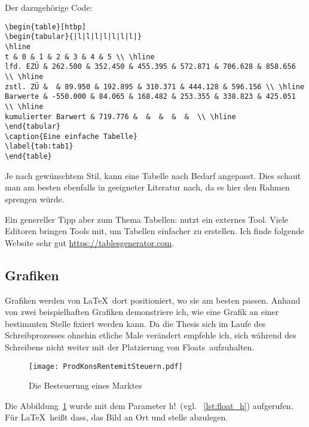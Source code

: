 Der dazugehörige Code:
\begin{lstlisting}[float=htb,caption=Darstellungen einer Tabelle in \protect\LaTeX{},label=lst:bsptabelle]
\begin{table}[htbp]
\begin{tabular}{|l|l|l|l|l|l|l|}
\hline
t & 0 & 1 & 2 & 3 & 4 & 5 \\ \hline
lfd. EZÜ & 262.500 & 352.450 & 455.395 & 572.871 & 706.628 & 858.656 \\ \hline
zstl. ZÜ &  & 89.950 & 192.895 & 310.371 & 444.128 & 596.156 \\ \hline
Barwerte & -550.000 & 84.065 & 168.482 & 253.355 & 338.823 & 425.051 \\ \hline
kumulierter Barwert & 719.776 &  &  &  &  &  \\ \hline
\end{tabular}
\caption{Eine einfache Tabelle}
\label{tab:tab1}
\end{table}
\end{lstlisting}

Je nach gewünschtem Stil, kann eine Tabelle nach Bedarf angepasst. Dies schaut man am besten ebenfalls in geeigneter Literatur nach, da es hier den Rahmen sprengen würde.

Ein genereller Tipp aber zum Thema Tabellen: nutzt ein externes Tool. Viele Editoren bringen Tools mit, um Tabellen einfacher zu erstellen. Ich finde folgende Website sehr gut \href{https://tablesgenerator.com}{https://tablesgenerator.com}.
\subsection{Grafiken}%
\label{sec:graphics}
Grafiken werden von \LaTeX{}\ dort positioniert, wo sie am besten passen. Anhand von zwei beispielhaften Grafiken demonstriere ich, wie eine Grafik an einer bestimmten Stelle fixiert werden kann. Da die Thesis sich im Laufe des Schreibprozesses ohnehin etliche Male verändert empfehle ich, sich während des Schreibens nicht weiter mit der Platzierung von \glqq Floats\grqq\ aufzuhalten.

\begin{figure}[h!]
  \centering
     \texttt{[image: ProdKonsRentemitSteuern.pdf]}
     \caption{Die Besteuerung eines Marktes}
     \label{fig:bild}
\end{figure}

Die Abbildung~\ref{fig:bild} wurde mit dem Parameter \glqq h!\grqq\ (vgl. ~\ref{lst:float_h}) aufgerufen. Für \LaTeX{}\ heißt dass, das Bild an Ort und stelle abzulegen.%

